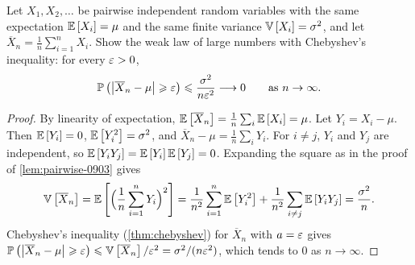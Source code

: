 \begin{exercisebox}
\begin{exercise}\label{ex:wlln-0908}\label{thm:wlln-0908}
    Let $X_1, X_2, \dots$ be pairwise independent random variables with the same expectation
    $\expectation{X_i} = \mu$ and the same finite variance $\operatorname{\mathbb{V}}\left[X_i\right] = \sigma^2$, and let
    $\overline{X}_n = \frac{1}{n} \sum_{i=1}^{n} X_i$. Show the weak law of large numbers with
    Chebyshev's inequality: for every $\varepsilon > 0$,
    \[\prob{\abs{\overline{X}_n - \mu} \geq \eps} \leq \frac{\sigma^2}{n \eps^2}
        \longrightarrow 0 \qquad \text{as } n \to \infty.\]
\end{exercise}
\tcblower
\begin{proof}
    By linearity of expectation, $\expectation{\overline{X}_n} = \frac{1}{n} \sum_{i} \expectation{X_i} = \mu$.
    Let $Y_i = X_i - \mu$. Then $\expectation{Y_i} = 0$, $\expectation{Y_i^2} = \sigma^2$, and
    $\overline{X}_n - \mu = \frac{1}{n} \sum_{i} Y_i$. For $i \neq j$, $Y_i$ and $Y_j$ are independent,
    so $\expectation{Y_i Y_j} = \expectation{Y_i} \expectation{Y_j} = 0$. Expanding the square as
    in the proof of \cref{lem:pairwise-0903} gives
    \[\variance{\overline{X}_n}
        = \expectation{\Big(\frac{1}{n} \sum_{i=1}^{n} Y_i\Big)^2}
        = \frac{1}{n^2} \sum_{i=1}^{n} \expectation{Y_i^2}
        + \frac{1}{n^2} \sum_{i \neq j} \expectation{Y_i Y_j}
        = \frac{\sigma^2}{n}.\]
    Chebyshev's inequality (\cref{thm:chebyshev}) for $\overline{X}_n$ with $a = \varepsilon$ gives
    $\prob{\abs{\overline{X}_n - \mu} \geq \eps} \leq \sfrac{\variance{\overline{X}_n}}{\eps^2}
        = \sfrac{\sigma^2}{(n \eps^2)}$, which tends to $0$ as $n \to \infty$.
\end{proof}
\end{exercisebox}

